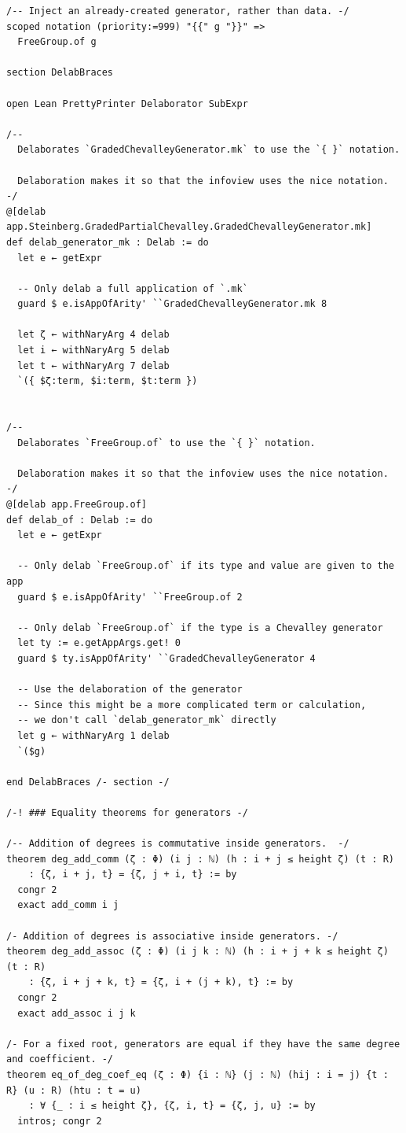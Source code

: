 \documentclass[10pt,a4paper]{article}
\begin{document}
\begin{Verbatim}
/-- Inject an already-created generator, rather than data. -/
scoped notation (priority:=999) "{{" g "}}" =>
  FreeGroup.of g

section DelabBraces

open Lean PrettyPrinter Delaborator SubExpr

/--
  Delaborates `GradedChevalleyGenerator.mk` to use the `{ }` notation.

  Delaboration makes it so that the infoview uses the nice notation.
-/
@[delab app.Steinberg.GradedPartialChevalley.GradedChevalleyGenerator.mk]
def delab_generator_mk : Delab := do
  let e ← getExpr

  -- Only delab a full application of `.mk`
  guard $ e.isAppOfArity' ``GradedChevalleyGenerator.mk 8

  let ζ ← withNaryArg 4 delab
  let i ← withNaryArg 5 delab
  let t ← withNaryArg 7 delab
  `({ $ζ:term, $i:term, $t:term })


/--
  Delaborates `FreeGroup.of` to use the `{ }` notation.

  Delaboration makes it so that the infoview uses the nice notation.
-/
@[delab app.FreeGroup.of]
def delab_of : Delab := do
  let e ← getExpr

  -- Only delab `FreeGroup.of` if its type and value are given to the app
  guard $ e.isAppOfArity' ``FreeGroup.of 2

  -- Only delab `FreeGroup.of` if the type is a Chevalley generator
  let ty := e.getAppArgs.get! 0
  guard $ ty.isAppOfArity' ``GradedChevalleyGenerator 4

  -- Use the delaboration of the generator
  -- Since this might be a more complicated term or calculation,
  -- we don't call `delab_generator_mk` directly
  let g ← withNaryArg 1 delab
  `($g)

end DelabBraces /- section -/

/-! ### Equality theorems for generators -/

/-- Addition of degrees is commutative inside generators.  -/
theorem deg_add_comm (ζ : Φ) (i j : ℕ) (h : i + j ≤ height ζ) (t : R)
    : {ζ, i + j, t} = {ζ, j + i, t} := by
  congr 2
  exact add_comm i j

/- Addition of degrees is associative inside generators. -/
theorem deg_add_assoc (ζ : Φ) (i j k : ℕ) (h : i + j + k ≤ height ζ) (t : R)
    : {ζ, i + j + k, t} = {ζ, i + (j + k), t} := by
  congr 2
  exact add_assoc i j k

/- For a fixed root, generators are equal if they have the same degree and coefficient. -/
theorem eq_of_deg_coef_eq (ζ : Φ) {i : ℕ} (j : ℕ) (hij : i = j) {t : R} (u : R) (htu : t = u)
    : ∀ {_ : i ≤ height ζ}, {ζ, i, t} = {ζ, j, u} := by
  intros; congr 2


\end{Verbatim}
\end{document}
